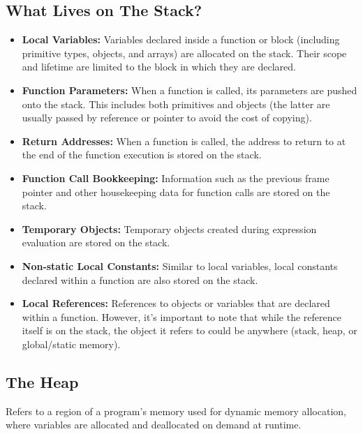 \documentclass{report}
\begin{document}
\begin{concept}
    \bigbreak \noindent 
    \subsection{What Lives on The Stack?}
    \bigbreak \noindent 
    \begin{itemize}
        \item \textbf{Local Variables:} Variables declared inside a function or block (including primitive types, objects, and arrays) are allocated on the stack. Their scope and lifetime are limited to the block in which they are declared.
        \item \textbf{Function Parameters:} When a function is called, its parameters are pushed onto the stack. This includes both primitives and objects (the latter are usually passed by reference or pointer to avoid the cost of copying).
        \item \textbf{Return Addresses:} When a function is called, the address to return to at the end of the function execution is stored on the stack.
        \item \textbf{Function Call Bookkeeping:} Information such as the previous frame pointer and other housekeeping data for function calls are stored on the stack.
        \item \textbf{Temporary Objects:} Temporary objects created during expression evaluation are stored on the stack.
        \item \textbf{Non-static Local Constants:} Similar to local variables, local constants declared within a function are also stored on the stack.
        \item \textbf{Local References:} References to objects or variables that are declared within a function. However, it's important to note that while the reference itself is on the stack, the object it refers to could be anywhere (stack, heap, or global/static memory).
    \end{itemize}

    \bigbreak \noindent 

    \pagebreak 
    \subsection{The Heap}
    \bigbreak \noindent 
    \begin{concept}
        Refers to a region of a program's memory used for dynamic memory allocation, where variables are allocated and deallocated on demand at runtime. 
    \end{concept}
    \bigbreak \noindent 

\end{concept}
\end{document}
